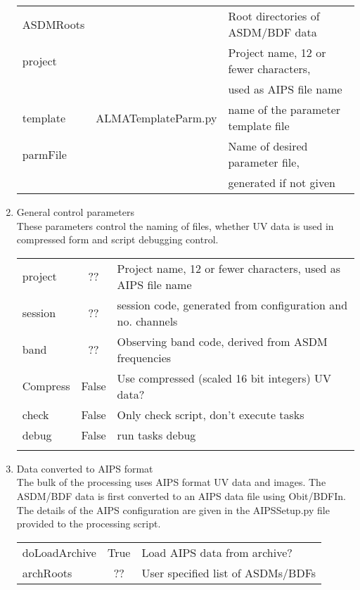 \documentclass[11pt]{article}
\begin{document}
\begin{enumerate}
\begin{center}
\begin{tabular}{|l|c|l|}
\hline
ASDMRoots & & Root directories of ASDM/BDF data\\
project  & & Project name, 12 or fewer characters, \\
 & & used as AIPS file name \\
template & ALMATemplateParm.py & name of the parameter template
file\\
parmFile &  & Name of desired parameter file, \\
 & & generated if not given\\
\hline
\end{tabular}
\end{center}
%
\item General control parameters\\
These parameters control the naming of files, whether UV data is used
in compressed form and script debugging control.
\begin{center}
\begin{tabular}{|l|c|l|}
\hline
 project & ?? &  Project name, 12 or fewer characters,  used as AIPS file name\\
 session & ?? &  session code, generated from configuration and no. channels\\
 band  & ?? &  Observing band code, derived from ASDM frequencies\\
 Compress & False &  Use compressed (scaled 16 bit integers) UV data?\\
 check & False &  Only check script, don't execute tasks\\
 debug & False &  run tasks debug\\
  &  &  \\
\hline
\end{tabular}
\end{center}
%
\item Data converted to AIPS format\\
The bulk of the processing uses AIPS format UV data and images.
The ASDM/BDF data is first converted to an AIPS data file using Obit/BDFIn.
The details of the AIPS configuration are given in the AIPSSetup.py
file provided to the processing script.
\begin{center}
\begin{tabular}{|l|c|l|}
\hline
doLoadArchive  & True & Load AIPS data from archive? \\
archRoots  & ?? &  User specified list of ASDMs/BDFs\\

\end{tabular}
\end{center}
\end{enumerate}
\end{document}
